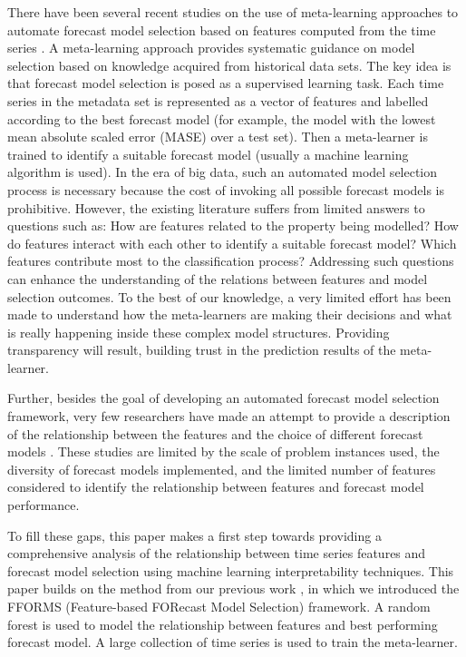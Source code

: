 \documentclass[11pt,a4paper,]{article}
\begin{document}
There have been several recent studies on the use of meta-learning approaches to automate forecast model selection based on features computed from the time series \autocites{shah1997model}{prudencio2004meta}{lemke2010meta}{kuck2016meta}. A meta-learning approach provides systematic guidance on model selection based on knowledge acquired from historical data sets. The key idea is that forecast model selection is posed as a supervised learning task. Each time series in the metadata set is represented as a vector of features and labelled according to the best forecast model (for example, the model with the lowest mean absolute scaled error (MASE) over a test set). Then a meta-learner is trained to identify a suitable forecast model (usually a machine learning algorithm is used). In the era of big data, such an automated model selection process is necessary because the cost of invoking all possible forecast models is prohibitive. However, the existing literature suffers from limited answers to questions such as: How are features related to the property being modelled? How do features interact with each other to identify a suitable forecast model? Which features contribute most to the classification process? Addressing such questions can enhance the understanding of the relations between features and model selection outcomes. To the best of our knowledge, a very limited effort has been made to understand how the meta-learners are making their decisions and what is really happening inside these complex model structures. Providing transparency will result, building trust in the prediction results of the meta-learner.

Further, besides the goal of developing an automated forecast model selection framework, very few researchers have made an attempt to provide a description of the relationship between the features and the choice of different forecast models \autocites{schnaars1984situational}{wang2009rule}{lemke2010meta}[ are among some exceptions]{petropoulos2014horses}. These studies are limited by the scale of problem instances used, the diversity of forecast models implemented, and the limited number of features considered to identify the relationship between features and forecast model performance.

To fill these gaps, this paper makes a first step towards providing a comprehensive analysis of the relationship between time series features and forecast model selection using machine learning interpretability techniques. This paper builds on the method from our previous work \textcite{fforms}, in which we introduced the FFORMS (Feature-based FORecast Model Selection) framework. A random forest is used to model the relationship between features and best performing forecast model. A large collection of time series is used to train the meta-learner.
\end{document}
